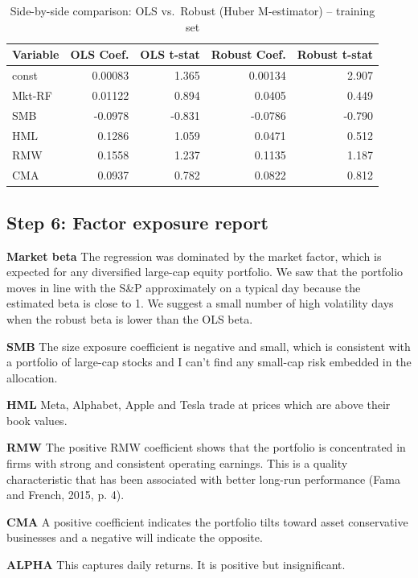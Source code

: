 \documentclass[11pt,a4paper]{article}
\begin{document}
\begin{table}[H]
\centering
\caption{Side-by-side comparison: OLS vs.\ Robust (Huber M-estimator) -- training set}
\begin{tabular}{lrrrr}
\toprule
Variable & OLS Coef. & OLS t-stat & Robust Coef. & Robust t-stat \\
\midrule
const   & 0.00083 & 1.365 & 0.00134 & 2.907 \\
Mkt-RF  & 0.01122 & 0.894 & 0.0405  & 0.449  \\
SMB     & -0.0978 & -0.831& -0.0786 & -0.790 \\
HML     & 0.1286  & 1.059 & 0.0471  & 0.512  \\
RMW     & 0.1558  & 1.237 & 0.1135  & 1.187  \\
CMA     & 0.0937  & 0.782 & 0.0822  & 0.812  \\
\bottomrule
\end{tabular}
\label{tab:ff5_reg_sidebyside}
\end{table}

\subsection{Step 6: Factor exposure report}
\textbf{Market beta}  
The regression was dominated by the market factor, which is expected for any diversified large-cap equity portfolio. We saw that the portfolio moves in line with the S\&P approximately on a typical day because the estimated beta is close to 1. We suggest a small number of high volatility days when the robust beta is lower than the OLS beta.

\textbf{SMB}  
The size exposure coefficient is negative and small, which is consistent with a portfolio of large-cap stocks and I can't find any small-cap risk embedded in the allocation.

\textbf{HML}  
Meta, Alphabet, Apple and Tesla trade at prices which are above their book values.

\textbf{RMW}  
The positive RMW coefficient shows that the portfolio is concentrated in firms with strong and consistent operating earnings. This is a quality characteristic that has been associated with better long-run performance (Fama and French, 2015, p. 4).

\textbf{CMA}  
A positive coefficient indicates the portfolio tilts toward asset conservative businesses and a negative will indicate the opposite.

\textbf{ALPHA}  
This captures daily returns. It is positive but insignificant.
\end{document}
